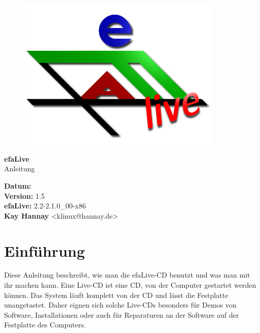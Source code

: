 \documentclass[a4paper,12pt,twoside]{article}
\title{\Title}
\author{\Author}
\date{\DocDate}
\begin{document}

\begin{titlepage}
    \vspace*{1cm}
    \begin{center}
        \begin{figure}
            \centering
            \includegraphics[width=9.745cm,height=7.308cm]{efaLivede-img/efaLivede-img1.png}
        \end{figure}
        \Huge
        \textbf{efaLive} \\[0.1cm]
        \LARGE
        Anleitung \\[5cm]
    \end{center}
    \normalsize
    \textbf{Datum:} {\DocDate} \\
    \textbf{Version:} 1.5 \\
    \textbf{efaLive:} 2.2-2.1.0\_00-x86 \\
    \textbf{Kay Hannay} <klinux@hannay.de> \\
\end{titlepage}


\tableofcontents
\clearpage\setcounter{page}{1}
\section{Einführung}
\label{sct:einfuehrung}
Diese Anleitung beschreibt, wie man die efaLive-CD benutzt und was man
mit ihr machen kann. Eine Live-CD ist eine CD, von der Computer
gestartet werden können. Das System läuft komplett von der CD und lässt
die Festplatte unangetastet. Daher eignen sich solche Live-CDs
besonders für Demos von Software, Installationen oder auch für
Reparaturen an der Software auf der Festplatte des Computers.
\end{document}
